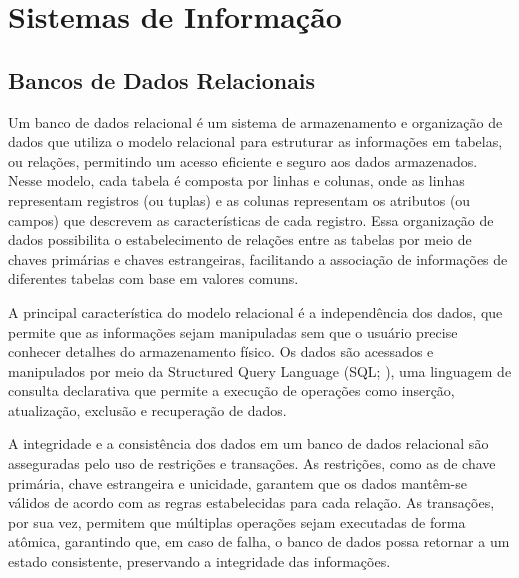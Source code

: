 



\section{Sistemas de Informação}
\label{sec:sistemas-informacao}
\subsection{Bancos de Dados Relacionais}

Um banco de dados relacional \cite{relational-database,relational-database-2} é um sistema de armazenamento e organização de dados que utiliza o modelo relacional para estruturar as informações em tabelas, ou relações, permitindo um acesso eficiente e seguro aos dados armazenados. Nesse modelo, cada tabela é composta por linhas e colunas, onde as linhas representam registros (ou tuplas) e as colunas representam os atributos (ou campos) que descrevem as características de cada registro. Essa organização de dados possibilita o estabelecimento de relações entre as tabelas por meio de chaves primárias e chaves estrangeiras, facilitando a associação de informações de diferentes tabelas com base em valores comuns.

A principal característica do modelo relacional é a independência dos dados, que permite que as informações sejam manipuladas sem que o usuário precise conhecer detalhes do armazenamento físico. Os dados são acessados e manipulados por meio da Structured Query Language (SQL; \citealp{sequel}), uma linguagem de consulta declarativa que permite a execução de operações como inserção, atualização, exclusão e recuperação de dados.

A integridade e a consistência dos dados em um banco de dados relacional são asseguradas pelo uso de restrições e transações. As restrições, como as de chave primária, chave estrangeira e unicidade, garantem que os dados mantêm-se válidos de acordo com as regras estabelecidas para cada relação. As transações, por sua vez, permitem que múltiplas operações sejam executadas de forma atômica, garantindo que, em caso de falha, o banco de dados possa retornar a um estado consistente, preservando a integridade das informações.

